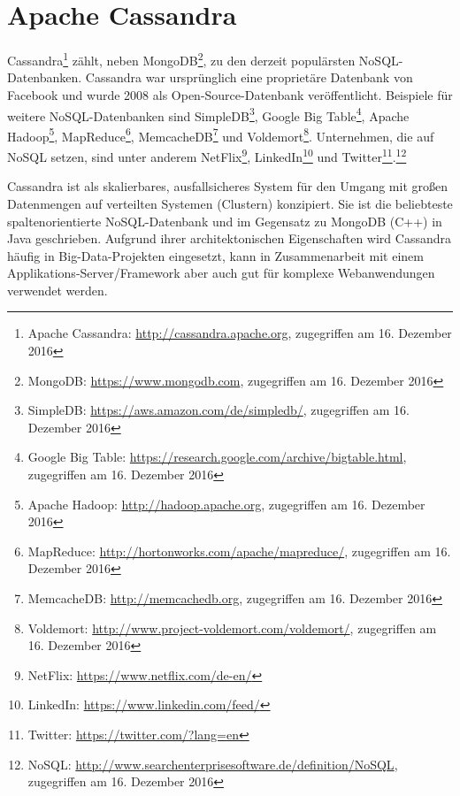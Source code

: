 \section{Apache Cassandra}
Cassandra\footnote{Apache Cassandra: \url{http://cassandra.apache.org}, zugegriffen am 16. Dezember 2016} zählt, neben MongoDB\footnote{MongoDB: \url{https://www.mongodb.com}, zugegriffen am 16. Dezember 2016}, zu den derzeit populärsten NoSQL-Datenbanken. Cassandra war ursprünglich eine proprietäre Datenbank von Facebook und wurde 2008 als Open-Source-Datenbank veröffentlicht. Beispiele für weitere NoSQL-Datenbanken sind SimpleDB\footnote{SimpleDB: \url{https://aws.amazon.com/de/simpledb/}, zugegriffen am 16. Dezember 2016}, Google Big Table\footnote{Google Big Table: \url{https://research.google.com/archive/bigtable.html}, zugegriffen am 16. Dezember 2016}, Apache Hadoop\footnote{Apache Hadoop: \url{http://hadoop.apache.org}, zugegriffen am 16. Dezember 2016}, MapReduce\footnote{MapReduce: \url{http://hortonworks.com/apache/mapreduce/}, zugegriffen am 16. Dezember 2016}, MemcacheDB\footnote{MemcacheDB: \url{http://memcachedb.org}, zugegriffen am 16. Dezember 2016} und Voldemort\footnote{Voldemort: \url{http://www.project-voldemort.com/voldemort/}, zugegriffen am 16. Dezember 2016}. Unternehmen, die auf NoSQL setzen, sind unter anderem NetFlix\footnote{NetFlix: \url{https://www.netflix.com/de-en/}}, LinkedIn\footnote{LinkedIn: \url{https://www.linkedin.com/feed/}} und Twitter\footnote{Twitter: \url{https://twitter.com/?lang=en}}.\footnote{NoSQL: \url{http://www.searchenterprisesoftware.de/definition/NoSQL}, zugegriffen am 16. Dezember 2016}\newline

Cassandra ist als skalierbares, ausfallsicheres System für den Umgang mit großen Datenmengen auf verteilten Systemen (Clustern) konzipiert. Sie ist die beliebteste spaltenorientierte NoSQL-Datenbank und im Gegensatz zu MongoDB (C++) in Java geschrieben. Aufgrund ihrer architektonischen Eigenschaften wird Cassandra häufig in Big-Data-Projekten eingesetzt, kann in Zusammenarbeit mit einem Applikations-Server/Framework aber auch gut für komplexe Webanwendungen verwendet werden.
